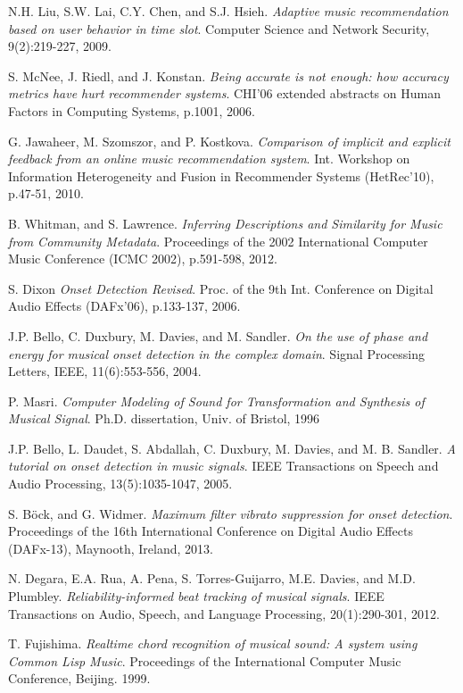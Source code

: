 \documentclass[11pt, oneside]{Thesis} %
\begin{document}
\begin{thebibliography}{99}
N.H. Liu, S.W. Lai, C.Y. Chen, and S.J. Hsieh.
\textit{Adaptive music recommendation based on user behavior in time slot}.
Computer Science and Network Security, 9(2):219-227, 2009.

S. McNee, J. Riedl, and J. Konstan.
\textit{Being accurate is not enough: how accuracy metrics have hurt recommender systems}.
CHI'06 extended abstracts on Human Factors in Computing Systems, p.1001, 2006.

G. Jawaheer, M. Szomszor, and P. Kostkova.
\textit{Comparison of implicit and explicit feedback from an online music recommendation system}.
Int. Workshop on Information Heterogeneity and Fusion in Recommender Systems (HetRec'10), p.47-51, 2010.

B. Whitman, and S. Lawrence.
\textit{Inferring Descriptions and Similarity for Music from Community Metadata}.
Proceedings of the 2002 International Computer Music Conference (ICMC 2002), p.591-598, 2012.

S. Dixon
\textit{Onset Detection Revised}.
Proc. of the 9th Int. Conference on Digital Audio Effects (DAFx’06), p.133-137, 2006.

J.P. Bello, C. Duxbury, M. Davies, and M. Sandler.
\textit{On the use of phase and energy for musical onset detection in the complex domain}.
Signal Processing Letters, IEEE, 11(6):553-556, 2004.

P. Masri.
\textit{Computer Modeling of Sound for Transformation and Synthesis of Musical Signal}.
Ph.D. dissertation, Univ. of Bristol, 1996


J.P. Bello, L. Daudet, S. Abdallah, C. Duxbury, M. Davies, and M. B. Sandler.
\textit{A tutorial on onset detection in music signals}.
IEEE Transactions on Speech and Audio Processing, 13(5):1035-1047, 2005.

S. Böck, and G. Widmer.
\textit{Maximum filter vibrato suppression for onset detection}.
Proceedings of the 16th International Conference on Digital Audio Effects (DAFx-13), Maynooth, Ireland, 2013.

N. Degara, E.A. Rua, A. Pena, S. Torres-Guijarro, M.E. Davies, and M.D. Plumbley.
\textit{Reliability-informed beat tracking of musical signals}.
IEEE Transactions on Audio, Speech, and Language Processing, 20(1):290-301, 2012.

T. Fujishima.
\textit{Realtime chord recognition of musical sound: A system using Common Lisp Music}.
Proceedings of the International Computer Music Conference, Beijing. 1999.


\end{thebibliography}
\end{document}
